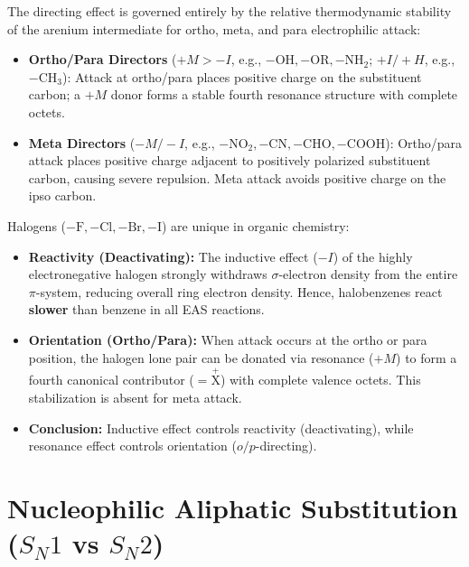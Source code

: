 \documentclass[10pt,twoside,openright]{book}
\begin{document}
\begin{conceptbox}
The directing effect is governed entirely by the relative thermodynamic stability of the arenium intermediate for ortho, meta, and para electrophilic attack:
\begin{itemize}[leftmargin=*]
  \item \textbf{Ortho/Para Directors} ($+M > -I$, e.g., $-\mathrm{OH, -OR, -NH_2}$; $+I/+H$, e.g., $-\mathrm{CH_3}$):
  Attack at ortho/para places positive charge on the substituent carbon; a $+M$ donor forms a stable fourth resonance structure with complete octets.
  \item \textbf{Meta Directors} ($-M / -I$, e.g., $-\mathrm{NO_2, -CN, -CHO, -COOH}$):
  Ortho/para attack places positive charge adjacent to positively polarized substituent carbon, causing severe repulsion. Meta attack avoids positive charge on the ipso carbon.
\end{itemize}
\end{conceptbox}

\begin{trapbox}
Halogens ($-\mathrm{F, -Cl, -Br, -I}$) are unique in organic chemistry:
\begin{itemize}
  \item \textbf{Reactivity (Deactivating):} The inductive effect ($-I$) of the highly electronegative halogen strongly withdraws $\sigma$-electron density from the entire $\pi$-system, reducing overall ring electron density. Hence, halobenzenes react \textbf{slower} than benzene in all EAS reactions.
  \item \textbf{Orientation (Ortho/Para):} When attack occurs at the ortho or para position, the halogen lone pair can be donated via resonance ($+M$) to form a fourth canonical contributor ($=\overset{+}{\mathrm{X}}$) with complete valence octets. This stabilization is absent for meta attack.
  \item \textbf{Conclusion:} Inductive effect controls reactivity (deactivating), while resonance effect controls orientation ($o/p$-directing).
\end{itemize}
\end{trapbox}

\newpage
\section{Nucleophilic Aliphatic Substitution (\texorpdfstring{$S_N1$}{SN1} vs \texorpdfstring{$S_N2$}{SN2})}
\end{document}
